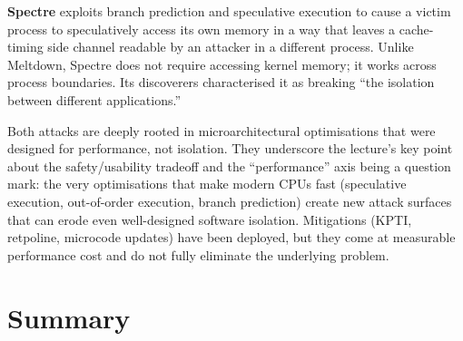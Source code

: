 \documentclass[11pt]{article}
\begin{document}
\textbf{Spectre} exploits branch prediction and speculative execution to cause a victim
process to speculatively access its own memory in a way that leaves a cache-timing side
channel readable by an attacker in a different process. Unlike Meltdown, Spectre does not
require accessing kernel memory; it works across process boundaries. Its discoverers
characterised it as breaking ``the isolation between different applications.''

Both attacks are deeply rooted in microarchitectural optimisations that were designed for
performance, not isolation. They underscore the lecture's key point about the safety/usability
tradeoff and the ``performance'' axis being a question mark: the very optimisations that make
modern CPUs fast (speculative execution, out-of-order execution, branch prediction) create
new attack surfaces that can erode even well-designed software isolation. Mitigations
(KPTI, retpoline, microcode updates) have been deployed, but they come at measurable
performance cost and do not fully eliminate the underlying problem.

\section{Summary}
\end{document}
